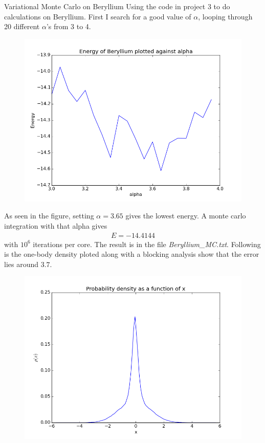 \documentclass[a4paper, 12pt, titlepage]{article}
\begin{document}
\begin{section}{Variational Monte Carlo on Beryllium}
 Using the code in project 3 to do calculations on Beryllium. First I search for a good value of $\alpha$, looping through 20 different $\alpha$'s from 3 to 4.
 \begin{figure}
 	\centering
 	\includegraphics[width=\textwidth]{../python_programs/FindOptimalAlphaBeryllium.png}
 \end{figure}
 As seen in the figure, setting $\alpha = 3.65$ gives the lowest energy. A monte carlo integration with that alpha gives 
 \begin{align*}
 	E = -14.4144
 \end{align*}
 with $10^6$ iterations per core. The result is in the file \textit{Beryllium\_MC.txt}. Following is the one-body density ploted along with a blocking analysis show that the error lies around $3.7$. 
 \begin{figure}
 	\centering
 	\includegraphics[width=\textwidth]{../python_programs/ProbabilityDensityBeryllium.png}

\end{figure}
\end{section}
\end{document}
